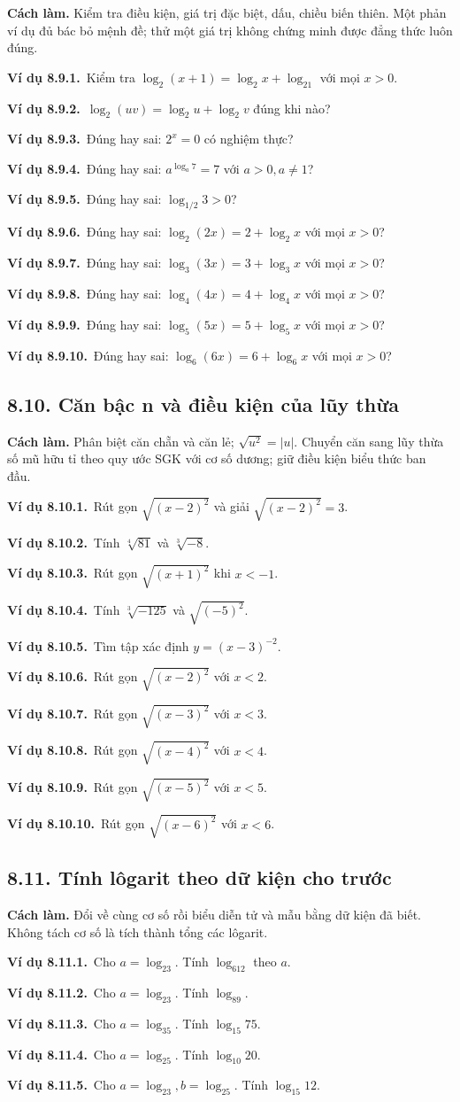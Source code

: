 \documentclass[11pt,a4paper]{article}
\newcommand{\vd}[1]{\par\Needspace{3\baselineskip}\textbf{\color{teal}Ví dụ #1.}\ }
\begin{document}
\begin{tcolorbox}\textbf{Cách làm.} Kiểm tra điều kiện, giá trị đặc biệt, dấu, chiều biến thiên. Một phản ví dụ đủ bác bỏ mệnh đề; thử một giá trị không chứng minh được đẳng thức luôn đúng.\end{tcolorbox}
\vd{8.9.1}Kiểm tra $\log_2(x+1)=\log_2x+\log_21$ với mọi $x>0$.
\vd{8.9.2}$\log_2(uv)=\log_2u+\log_2v$ đúng khi nào?
\vd{8.9.3}Đúng hay sai: $2^x=0$ có nghiệm thực?
\vd{8.9.4}Đúng hay sai: $a^{\log_a7}=7$ với $a>0,a\ne1$?
\vd{8.9.5}Đúng hay sai: $\log_{1/2}3>0$?
\vd{8.9.6}Đúng hay sai: $\log_{2}(2x)=2+\log_{2}x$ với mọi $x>0$?
\vd{8.9.7}Đúng hay sai: $\log_{3}(3x)=3+\log_{3}x$ với mọi $x>0$?
\vd{8.9.8}Đúng hay sai: $\log_{4}(4x)=4+\log_{4}x$ với mọi $x>0$?
\vd{8.9.9}Đúng hay sai: $\log_{5}(5x)=5+\log_{5}x$ với mọi $x>0$?
\vd{8.9.10}Đúng hay sai: $\log_{6}(6x)=6+\log_{6}x$ với mọi $x>0$?
\clearpage\subsection{8.10. Căn bậc n và điều kiện của lũy thừa}
\begin{tcolorbox}\textbf{Cách làm.} Phân biệt căn chẵn và căn lẻ; $\sqrt{u^2}=|u|$. Chuyển căn sang lũy thừa số mũ hữu tỉ theo quy ước SGK với cơ số dương; giữ điều kiện biểu thức ban đầu.\end{tcolorbox}
\vd{8.10.1}Rút gọn $\sqrt{(x-2)^2}$ và giải $\sqrt{(x-2)^2}=3$.
\vd{8.10.2}Tính $\sqrt[4]{81}$ và $\sqrt[3]{-8}$.
\vd{8.10.3}Rút gọn $\sqrt{(x+1)^2}$ khi $x<-1$.
\vd{8.10.4}Tính $\sqrt[3]{-125}$ và $\sqrt{(-5)^2}$.
\vd{8.10.5}Tìm tập xác định $y=(x-3)^{-2}$.
\vd{8.10.6}Rút gọn $\sqrt{(x-2)^2}$ với $x<2$.
\vd{8.10.7}Rút gọn $\sqrt{(x-3)^2}$ với $x<3$.
\vd{8.10.8}Rút gọn $\sqrt{(x-4)^2}$ với $x<4$.
\vd{8.10.9}Rút gọn $\sqrt{(x-5)^2}$ với $x<5$.
\vd{8.10.10}Rút gọn $\sqrt{(x-6)^2}$ với $x<6$.
\clearpage\subsection{8.11. Tính lôgarit theo dữ kiện cho trước}
\begin{tcolorbox}\textbf{Cách làm.} Đổi về cùng cơ số rồi biểu diễn tử và mẫu bằng dữ kiện đã biết. Không tách cơ số là tích thành tổng các lôgarit.\end{tcolorbox}
\vd{8.11.1}Cho $a=\log_23$. Tính $\log_612$ theo $a$.
\vd{8.11.2}Cho $a=\log_23$. Tính $\log_89$.
\vd{8.11.3}Cho $a=\log_35$. Tính $\log_{15}75$.
\vd{8.11.4}Cho $a=\log_25$. Tính $\log_{10}20$.
\vd{8.11.5}Cho $a=\log_23,b=\log_25$. Tính $\log_{15}12$.
\end{document}
